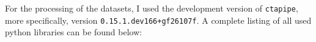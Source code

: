 For the processing of the datasets, I used the development version of \texttt{ctapipe}, more specifically, version
\texttt{0.15.1.dev166+gf26107f}. A complete listing of all used python libraries can be found below:
\begin{spacing}{0.5}
    \begin{mdframed}[backgroundcolor=codebg, hidealllines=true, leftmargin=0cm,rightmargin=0cm, skipabove=0pt, innerleftmargin=0,innerrightmargin=0,]
    
    \end{mdframed}
\end{spacing}
